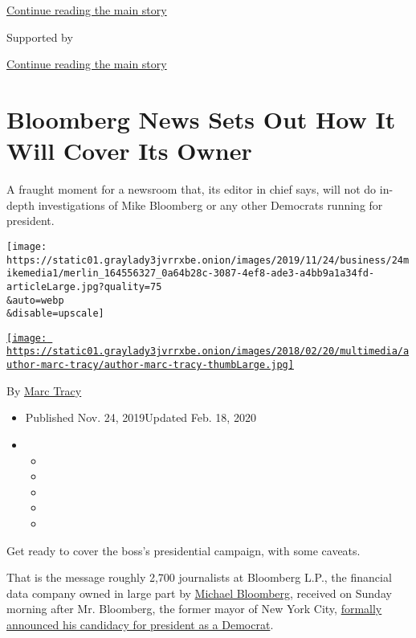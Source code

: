 \protect\hyperlink{after-top}{Continue reading the main story}

Supported by

\protect\hyperlink{after-sponsor}{Continue reading the main story}

\hypertarget{bloomberg-news-sets-out-how-it-will-cover-its-owner}{%
\section{Bloomberg News Sets Out How It Will Cover Its
Owner}\label{bloomberg-news-sets-out-how-it-will-cover-its-owner}}

A fraught moment for a newsroom that, its editor in chief says, will not
do in-depth investigations of Mike Bloomberg or any other Democrats
running for president.

\texttt{[image: https://static01.graylady3jvrrxbe.onion/images/2019/11/24/business/24mikemedia1/merlin\_164556327\_0a64b28c-3087-4ef8-ade3-a4bb9a1a34fd-articleLarge.jpg?quality=75\\\&auto=webp\\\&disable=upscale]}

\href{https://www.nytimes3xbfgragh.onion/by/marc-tracy}{\texttt{[image: https://static01.graylady3jvrrxbe.onion/images/2018/02/20/multimedia/author-marc-tracy/author-marc-tracy-thumbLarge.jpg]}}

By \href{https://www.nytimes3xbfgragh.onion/by/marc-tracy}{Marc Tracy}

\begin{itemize}
\item
  Published Nov. 24, 2019Updated Feb. 18, 2020
\item
  \begin{itemize}
  \item
  \item
  \item
  \item
  \item
  \end{itemize}
\end{itemize}

Get ready to cover the boss's presidential campaign, with some caveats.

That is the message roughly 2,700 journalists at Bloomberg L.P., the
financial data company owned in large part by
\href{https://www.nytimes3xbfgragh.onion/2020/02/18/podcasts/the-daily/michael-bloomberg-democrats.html}{Michael
Bloomberg}, received on Sunday morning after Mr. Bloomberg, the former
mayor of New York City,
\href{https://www.nytimes3xbfgragh.onion/2019/11/24/us/politics/michael-bloomberg-2020-presidency.html}{formally
announced his candidacy for president as a Democrat}.

